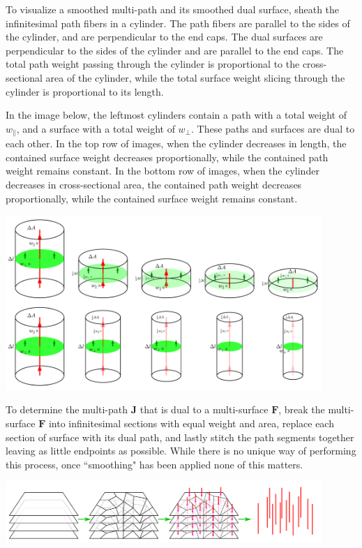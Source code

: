 To visualize a smoothed multi-path and its smoothed dual surface, sheath the infinitesimal path fibers in a cylinder. The path fibers are parallel to the sides of the cylinder, and are perpendicular to the end caps. The dual surfaces are perpendicular to the sides of the cylinder and are parallel to the end caps. The total path weight passing through the cylinder is proportional to the cross-sectional area of the cylinder, while the total surface weight slicing through the cylinder is proportional to its length.

In the image below, the leftmost cylinders contain a path with a total weight of \(w_{\parallel}\), and a surface with a total weight of \(w_{\perp}\). These paths and surfaces are dual to each other. In the top row of images, when the cylinder decreases in length, the contained surface weight decreases proportionally, while the contained path weight remains constant. In the bottom row of images, when the cylinder decreases in cross-sectional area, the contained path weight decreases proportionally, while the contained surface weight remains constant. 

\begin{center}
\includegraphics[width = 0.9\textwidth]{Duality/path_surface_duality_2}
\end{center}

To determine the multi-path \(\mathbf{J}\) that is dual to a multi-surface \(\mathbf{F}\), break the multi-surface \(\mathbf{F}\) into infinitesimal sections with equal weight and area, replace each section of surface with its dual path, and lastly stitch the path segments together leaving as little endpoints as possible. While there is no unique way of performing this process, once ``smoothing" has been applied none of this matters.  

\begin{center}
\includegraphics[width = 0.9\textwidth]{Duality/path_surface_duality_3}
\end{center}

